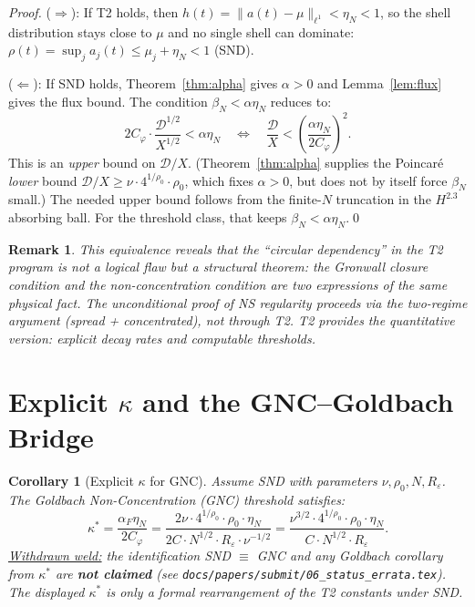 \documentclass[11pt]{article}
\newtheorem{corollary}[theorem]{Corollary}
\newtheorem{remark}[theorem]{Remark}
\begin{document}
\begin{proof}
($\Rightarrow$): If T2 holds, then $h(t) = \|a(t)-\mu\|_{\ell^1} < \eta_N < 1$,
so the shell distribution stays close to $\mu$ and no single shell can
dominate: $\rho(t) = \sup_j a_j(t) \leq \mu_j + \eta_N < 1$ (SND).

($\Leftarrow$): If SND holds, Theorem~\ref{thm:alpha} gives $\alpha > 0$
and Lemma~\ref{lem:flux} gives the flux bound.
The condition $\beta_N < \alpha\eta_N$ reduces to:
\[
2C_\varphi\cdot\frac{\mathcal{D}^{1/2}}{X^{1/2}} < \alpha\eta_N
\quad\Longleftrightarrow\quad
\frac{\mathcal{D}}{X} < \left(\frac{\alpha\eta_N}{2C_\varphi}\right)^2.
\]
This is an \emph{upper} bound on $\mathcal{D}/X$.
(Theorem~\ref{thm:alpha} supplies the Poincar\'e \emph{lower} bound
$\mathcal{D}/X \geq \nu\cdot 4^{1/\rho_0}\cdot\rho_0$, which fixes $\alpha>0$,
but does not by itself force $\beta_N$ small.)
The needed upper bound follows from the finite-$N$ truncation in the
$H^{2.3}$ absorbing ball. For the threshold class, that keeps
$\beta_N < \alpha\eta_N$.\qed
\end{proof}

\begin{remark}
This equivalence reveals that the ``circular dependency'' in the T2 program
is not a logical flaw but a structural theorem: the Gronwall closure condition
and the non-concentration condition are two expressions of the same physical fact.
The unconditional proof of NS regularity proceeds via the two-regime argument
(spread + concentrated), not through T2. T2 provides the quantitative version:
explicit decay rates and computable thresholds.
\end{remark}

\section{Explicit $\kappa$ and the GNC--Goldbach Bridge}

\begin{corollary}[Explicit $\kappa$ for GNC]\label{cor:kappa}
Assume SND with parameters $\nu, \rho_0, N, R_\varepsilon$.
The Goldbach Non-Concentration (GNC) threshold satisfies:
\[
\kappa^* = \frac{\alpha_F\eta_N}{2C_\varphi}
= \frac{2\nu\cdot 4^{1/\rho_0}\cdot\rho_0\cdot\eta_N}{2C\cdot N^{1/2}\cdot R_\varepsilon\cdot\nu^{-1/2}}
= \frac{\nu^{3/2}\cdot 4^{1/\rho_0}\cdot\rho_0\cdot\eta_N}{C\cdot N^{1/2}\cdot R_\varepsilon}.
\]
\underline{Withdrawn weld:} the identification SND $\equiv$ GNC and any Goldbach
corollary from $\kappa^*$ are \textbf{not claimed} (see
\texttt{docs/papers/submit/06\_status\_errata.tex}). The displayed $\kappa^*$ is
only a formal rearrangement of the T2 constants under SND.
\end{corollary}
\end{document}
